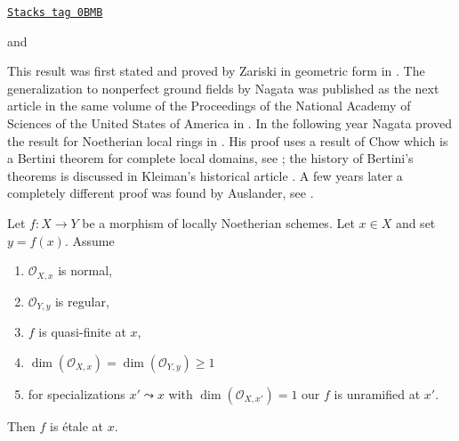 \begin{lemma}

\label{pione-lemma-purity}
\href{https://stacks.math.columbia.edu/tag/0BMB}{\texttt{Stacks tag 0BMB}}

\begin{reference}
\cite{Nagata-Purity} and \cite[Exp. X, Thm. 3.1]{SGA1}
\end{reference}
\begin{history}
This result was first stated and proved by Zariski in
geometric form in \cite{Zariski-Purity}.
The generalization to nonperfect ground fields by Nagata
was published as the next article in the same volume of the
Proceedings of the National Academy of Sciences of the United States of America
in \cite{Nagata-Remarks-Purity}. In the following year Nagata
proved the result for Noetherian local rings in \cite{Nagata-Purity}.
His proof uses a result of Chow which is a Bertini theorem for
complete local domains, see \cite{Chow-Bertini};
the history of Bertini's theorems is discussed in
Kleiman's historical article \cite{Kleiman-Bertini}.
A few years later a completely different proof was found by
Auslander, see \cite{Auslander-Purity}.
\end{history}
Let $f : X \to Y$ be a morphism of locally Noetherian schemes.
Let $x \in X$ and set $y = f(x)$. Assume
\begin{enumerate}
\item $\mathcal{O}_{X, x}$ is normal,
\item $\mathcal{O}_{Y, y}$ is regular,
\item $f$ is quasi-finite at $x$,
\item $\dim(\mathcal{O}_{X, x}) = \dim(\mathcal{O}_{Y, y}) \geq 1$
\item for specializations $x' \leadsto x$ with
$\dim(\mathcal{O}_{X, x'}) = 1$ our $f$ is unramified at $x'$.
\end{enumerate}
Then $f$ is \'etale at $x$.
\end{lemma}

